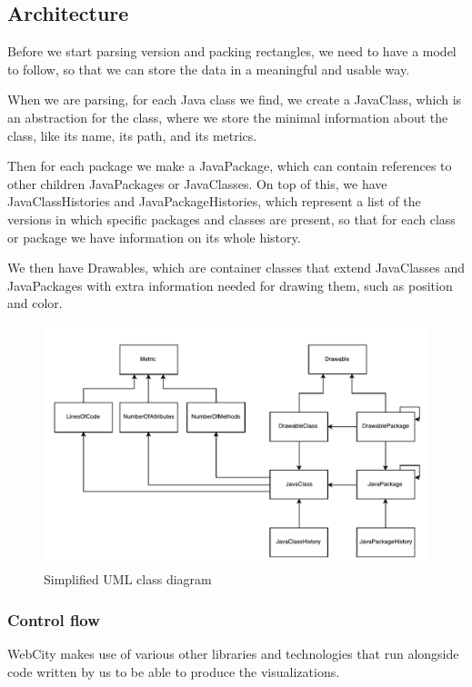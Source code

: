 \documentclass[]{usiinfbachelorproject}
\begin{document}
\subsection{Architecture} \label{Architecture}

Before we start parsing version and packing rectangles, we need to have a model to follow, so that we can store the data in a meaningful and usable way.

When we are parsing, for each Java class we find, we create a JavaClass, which is an abstraction for the class, where we store the minimal information about the class, like its name, its path, and its metrics.

Then for each package we make a JavaPackage, which can contain references to other children JavaPackages or JavaClasses.
On top of this, we have JavaClassHistories and JavaPackageHistories, which represent a list of the versions in which specific packages and classes are present, so that for each class or package we have information on its whole history.

We then have Drawables, which are container classes that extend JavaClasses and JavaPackages with extra information needed for drawing them, such as position and color.

\begin{figure} [H]
\centering
\includegraphics[width=1\textwidth]{pictures/models.pdf}
\caption{Simplified UML class diagram}
\label{fig:UML}
\end{figure}

\subsubsection{Control flow} \label{Control flow}
WebCity makes use of various other libraries and technologies that run alongside code written by us to be able to produce the visualizations.
\end{document}
